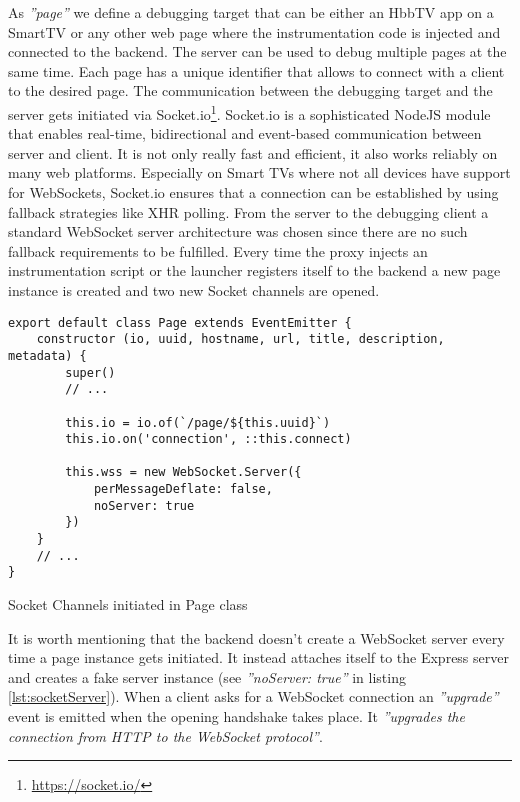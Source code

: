 As \textit{''page''} we define a debugging target that can be either an HbbTV app on a SmartTV or any other web page where the instrumentation code is injected and connected to the backend. The server can be used to debug multiple pages at the same time. Each page has a unique identifier that allows to connect with a client to the desired page. The communication between the debugging target and the server gets initiated via Socket.io\footnote{\url{https://socket.io/}}. Socket.io is a sophisticated NodeJS module that enables real-time, bidirectional and event-based communication between server and client. It is not only really fast and efficient, it also works reliably on many web platforms. Especially on Smart TVs where not all devices have support for WebSockets, Socket.io ensures that a connection can be established by using fallback strategies like XHR polling. From the server to the debugging client a standard WebSocket server architecture was chosen since there are no such fallback requirements to be fulfilled. Every time the proxy injects an instrumentation script or the launcher registers itself to the backend a new page instance is created and two new Socket channels are opened.

\begin{listing}[H]
\begin{verbatim}
export default class Page extends EventEmitter {
    constructor (io, uuid, hostname, url, title, description, metadata) {
        super()
        // ...

        this.io = io.of(`/page/${this.uuid}`)
        this.io.on('connection', ::this.connect)

        this.wss = new WebSocket.Server({
            perMessageDeflate: false,
            noServer: true
        })
    }
    // ...
}
\end{verbatim}
\caption{Socket Channels initiated in Page class}
\label{lst:socketServer}
\end{listing}

It is worth mentioning that the backend doesn't create a WebSocket server every time a page instance gets initiated. It instead attaches itself to the Express server and creates a fake server instance (see \textit{''noServer: true''} in listing \ref{lst:socketServer}). When a client asks for a WebSocket connection an \textit{''upgrade''} event is emitted when the opening handshake takes place. It \textit{''upgrades the connection from HTTP to the WebSocket protocol''}\cite{socket}.

